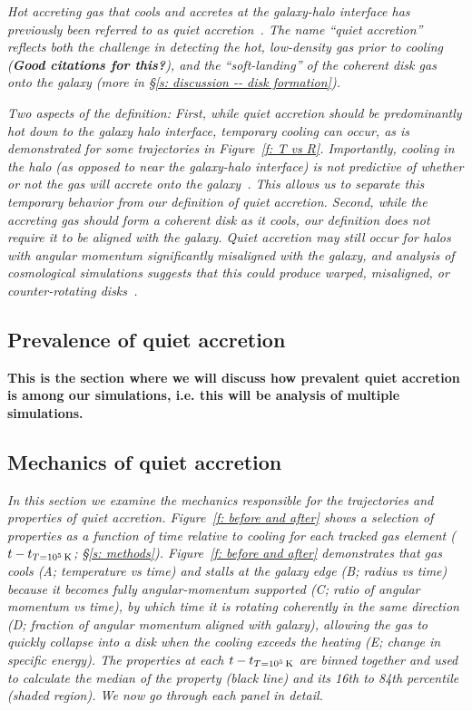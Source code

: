 \documentclass[fleqn,usenatbib]{mnras}
\newcommand{\tcon}{t_{T=10^5\,{\rm K}}}
\begin{document}
\textit{
Hot accreting gas that cools and accretes at the galaxy-halo interface has previously been referred to as \textit{quiet accretion}~\citep{Putman2012}.
The name ``quiet accretion'' reflects both the challenge in detecting the hot, low-density gas prior to cooling (\textbf{Good citations for this?}), and the ``soft-landing'' of the coherent disk gas onto the galaxy (more in \S\ref{s: discussion -- disk formation}).
}

\textit{
Two aspects of the definition:
First, while quiet accretion should be predominantly hot down to the galaxy halo interface, temporary cooling can occur, as is demonstrated for some trajectories in Figure~\ref{f: T vs R}.
Importantly, cooling in the halo (as opposed to near the galaxy-halo interface) is not predictive of whether or not the gas will accrete onto the galaxy~\citep{Esmerian2020}.
This allows us to separate this temporary behavior from our definition of quiet accretion.
Second, while the accreting gas should form a coherent disk as it cools, our definition does not require it to be aligned with the galaxy.
Quiet accretion may still occur for halos with angular momentum significantly misaligned with the galaxy, and analysis of cosmological simulations suggests that this could produce warped, misaligned, or counter-rotating disks~\citep[e.g.][]{Roskar2010, Starkenburg2019}.
}

\subsection{Prevalence of quiet accretion}
\label{s: prevalence}

\textbf{
This is the section where we will discuss how prevalent quiet accretion is among our simulations, i.e. this will be analysis of multiple simulations.
}

\subsection{Mechanics of quiet accretion}
\label{s: mechanics}

\textit{
In this section we examine the mechanics responsible for the trajectories and properties of quiet accretion.
Figure~\ref{f: before and after} shows a selection of properties as a function of time relative to cooling for each tracked gas element ($t - \tcon$; \S\ref{s: methods}).
Figure~\ref{f: before and after} demonstrates that gas cools (A; temperature vs time) and stalls at the galaxy edge (B; radius vs time) because it becomes fully angular-momentum supported (C; ratio of angular momentum vs time), by which time it is rotating coherently in the same direction (D; fraction of angular momentum aligned with galaxy), allowing the gas to quickly collapse into a disk when the cooling exceeds the heating (E; change in specific energy).
The properties at each $t - \tcon$ are binned together and used to calculate the median of the property (black line) and its 16th to 84th percentile (shaded region).
We now go through each panel in detail.
}
\end{document}
